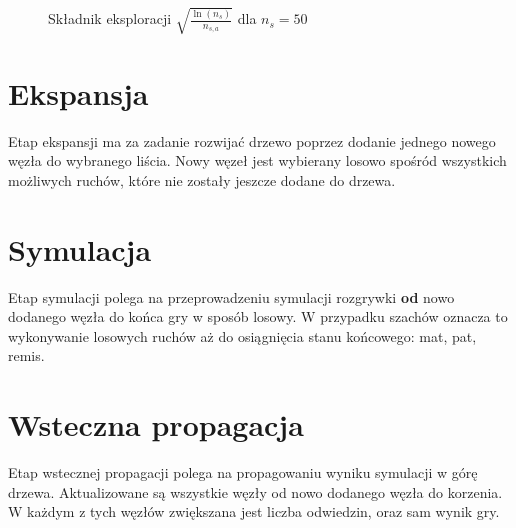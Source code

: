 \begin{figure}[!t]
\centering
{}
\caption{Składnik eksploracji $\sqrt{\frac{\ln(n_s)}{n_{s,a}}}$ dla $n_s=50$}
\label{fig:uct-exploration}
\end{figure}

\section{Ekspansja}
Etap ekspansji ma za zadanie rozwijać drzewo poprzez dodanie jednego nowego węzła do wybranego liścia. Nowy węzeł jest wybierany losowo spośród wszystkich możliwych ruchów, które nie zostały jeszcze dodane do drzewa.

\section{Symulacja}
Etap symulacji polega na przeprowadzeniu symulacji rozgrywki \textbf{od} nowo dodanego węzła do końca gry w sposób losowy. W przypadku szachów oznacza to wykonywanie losowych ruchów aż do osiągnięcia stanu końcowego: mat, pat, remis.

\section{Wsteczna propagacja}
Etap wstecznej propagacji polega na propagowaniu wyniku symulacji w górę drzewa. Aktualizowane są wszystkie węzły od nowo dodanego węzła do korzenia. W każdym z tych węzłów zwiększana jest liczba odwiedzin, oraz sam wynik gry.